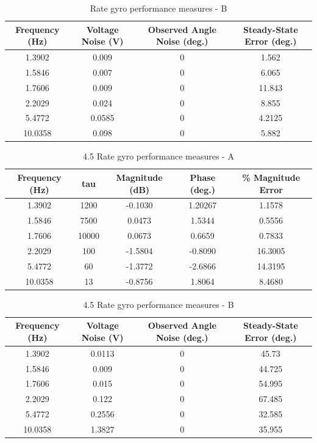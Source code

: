 \documentclass{article}
\theoremstyle{plain}
\theoremstyle{definition}
\theoremstyle{remark}
\begin{document}
\begin{table}
\begin{center}
    \begin{tabular}{|c|c|c|c|}
        \hline
        Frequency (Hz)  & Voltage Noise (V) & Observed Angle Noise (deg.) & Steady-State Error (deg.) \\ \hline
	1.3902  & 0.009  & 0 & 1.562\\
       1.5846  & 0.007  & 0 & 6.065 \\
	1.7606  & 0.009 & 0 & 11.843  \\
	2.2029 & 0.024  & 0 & 8.855   \\
	5.4772 & 0.0585  & 0 & 4.2125  \\
	10.0358 & 0.098 & 0 & 5.882 \\
        \hline
    \end{tabular}
\caption{Rate gyro performance measures - B}  
\label{gyro_tableB}
\end{center}
\end{table}

\begin{table}
\begin{center}
    \begin{tabular}{|c|c|c|c|c|}
        \hline
        Frequency (Hz)&tau  & Magnitude (dB) & Phase (deg.) & \% Magnitude Error \\ \hline
	1.3902& 1200  & -0.1030  & 1.20267 & 1.1578\\
       1.5846  & 7500& 0.0473  & 1.5344 & 0.5556\\
	1.7606 & 10000 & 0.0673 & 0.6659 & 0.7833  \\
	2.2029 & 100& -1.5804  & -0.8090 & 16.3005   \\
	5.4772 &60& -1.3772  & -2.6866 & 14.3195  \\
	10.0358 & 13& -0.8756 & 1.8064 & 8.4680 \\
        \hline
    \end{tabular}
\caption{4.5 Rate gyro performance measures - A}  
\label{gyro45_tableA}
\end{center}
\end{table}

\begin{table}
\begin{center}
    \begin{tabular}{|c|c|c|c|}
        \hline
        Frequency (Hz)  & Voltage Noise (V) & Observed Angle Noise (deg.) & Steady-State Error (deg.) \\ \hline
	1.3902  & 0.0113  & 0 & 45.73\\
       1.5846  & 0.009  & 0 & 44.725 \\
	1.7606  & 0.015 & 0 & 54.995  \\
	2.2029 & 0.122  & 0 & 67.485   \\
	5.4772 & 0.2556  & 0 & 32.585  \\
	10.0358 & 1.3827 & 0 & 35.955 \\
        \hline
    \end{tabular}
\caption{4.5 Rate gyro performance measures - B}  
\label{gyro45_tableB}
\end{center}
\end{table}
\end{document}
